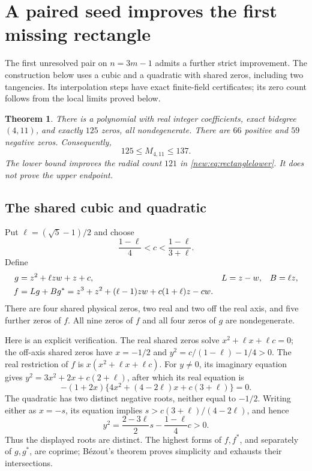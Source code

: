 \documentclass[UTF8,11pt]{ctexart}
\newtheorem{thm}{Theorem}[section]
\theoremstyle{definition}
\numberwithin{equation}{section}
\begin{document}
\section{A paired seed improves the first missing rectangle}
\label{v32:sec:paired}

The first unresolved pair on $n=3m-1$ admits a further strict
improvement. The construction below uses a cubic and a quadratic
with shared zeros, including two tangencies. Its interpolation
steps have exact finite-field certificates; its zero count follows
from the local limits proved below.

\begin{thm}\label{v32:thm:125}
There is a polynomial with real integer coefficients, exact
bidegree $(4,11)$, and exactly $125$ zeros, all nondegenerate.
There are $66$ positive and $59$ negative zeros.
Consequently,
\begin{equation}\label{v32:eq:bound}
 125\le M_{4,11}\le137.
\end{equation}
The lower bound improves the radial count $121$ in
\eqref{new:eq:rectanglelower}. It does not prove the upper endpoint.
\end{thm}

\subsection{The shared cubic and quadratic}

Put $\ell=(\sqrt5-1)/2$ and choose
\begin{equation}\label{v32:eq:interval}
 \frac{1-\ell}{4}<c<\frac{1-\ell}{3+\ell}.
\end{equation}
Define
\begin{align}
 g&=z^2+\ell zw+z+c, & L&=z-w, & B&=\ell z,\notag\\
 f&=Lg+Bg^*
   =z^3+z^2+(\ell-1)zw+c(1+\ell)z-cw.
                                      \label{v32:eq:pair}
\end{align}
There are four shared physical zeros, two real and two off the
real axis, and five further zeros of $f$. All nine zeros of $f$
and all four zeros of $g$ are nondegenerate.

Here is an explicit verification. The real shared zeros solve
$x^2+\ell x+\ell c=0$; the off-axis shared zeros have
$x=-1/2$ and $y^2=c/(1-\ell)-1/4>0$.
The real restriction of $f$ is $x(x^2+\ell x+\ell c)$.
For $y\ne0$, its imaginary equation gives
$y^2=3x^2+2x+c(2+\ell)$, after which its real equation is
\[
 -(1+2x)\{4x^2+(4-2\ell)x+c(3+\ell)\}=0.
\]
The quadratic has two distinct negative roots, neither equal
to $-1/2$. Writing either as $x=-s$, its equation implies
$s>c(3+\ell)/(4-2\ell)$, and hence
\[
 y^2=\frac{2-3\ell}{2}s-\frac{1-\ell}{4}c>0.
\]
Thus the displayed roots are distinct. The highest forms of
$f,f^*$, and separately of $g,g^*$, are coprime; B\'ezout's
theorem proves simplicity and exhausts their intersections.
\end{document}
